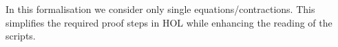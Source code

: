 In this
formalisation we consider only single equations/contractions. 
This  %
 simplifies the required proof steps in HOL   while enhancing the
 reading of the scripts.




